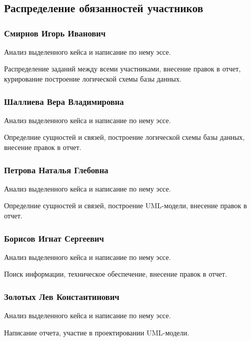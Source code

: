 \documentclass[14pt]{extreport}
\begin{document}
\chapter{}

\section{Распределение обязанностей участников}

\subsection{Смирнов Игорь Иванович}

Анализ выделенного кейса и написание по нему эссе.

Распределение заданий между всеми участниками, внесение правок в отчет, курирование построение логической схемы базы данных.

\subsection{Шаллиева Вера Владимировна}

Анализ выделенного кейса и написание по нему эссе.

Определние сущностей и связей, построение логической схемы базы данных, внесение правок в отчет.

\subsection{Петрова Наталья Глебовна}

Анализ выделенного кейса и написание по нему эссе.

Определние сущностей и связей, построение UML-модели, внесение правок в отчет.

\subsection{Борисов Игнат Сергеевич}

Анализ выделенного кейса и написание по нему эссе.

Поиск информации, техническое обеспечение, внесение правок в отчет.

\subsection{Золотых Лев Константинович}

Анализ выделенного кейса и написание по нему эссе.

Написание отчета, участие в проектировании UML-модели.
\end{document}
